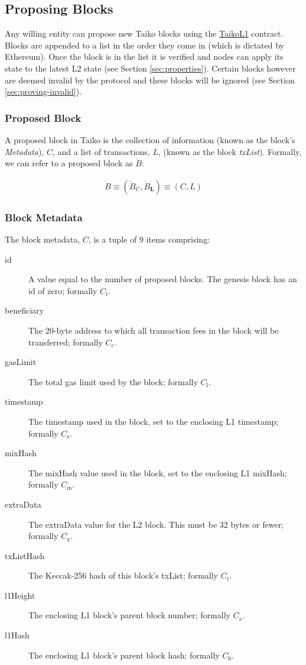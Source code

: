 \documentclass[9pt,oneside]{amsart}
\begin{document}
\begin{multicols}{2}
\subsection{Proposing Blocks}
Any willing entity can propose new Taiko blocks using the {\underline{TaikoL1}} contract. Blocks are appended to a list in the order they come in (which is dictated by Ethereum). Once the block is in the list it is verified and nodes can apply its state to the latest L2 state (see Section \ref{sec:properties}). Certain blocks however are deemed invalid by the protocol and these blocks will be ignored (see Section \ref{sec:proving-invalid}).

\subsubsection{Proposed Block} A proposed block in Taiko is the collection of information (known as the block's \emph{Metadata}), $C$, and a list of transactions, $L$,  (known as the block \emph{txList}). Formally, we can refer to a proposed block as $\dot{B}$:

\begin{eqnarray}
\dot{B} \equiv (\dot{B}_{\mathrm{C}}, \dot{B}_{\mathbf{L}}) \equiv (C, L)
\end{eqnarray}

\subsubsection{Block Metadata}\label{metadata} The block metadata, $C$, is a tuple of 9 items comprising:

\begin{description}
\item[id] A value equal to the number of proposed blocks. The genesis block has an id of zero; formally $C_{\mathrm{i}}$.
\item[beneficiary] The 20-byte address to which all transaction fees in the block will be transferred; formally $C_{\mathrm{c}}$.
\item[gasLimit] The total gas limit used by the block; formally $C_{\mathrm{l}}$.
\item[timestamp] The timestamp used in the block, set to the enclosing L1 timestamp; formally $C_{\mathrm{s}}$.
\item[mixHash] The mixHash value used in the block, set to the enclosing L1 mixHash; formally $C_{\mathrm{m}}$.
\item[extraData] The extraData value for the L2 block. This must be 32 bytes or fewer; formally $C_{\mathrm{x}}$.
\item[txListHash] The Keccak-256 hash of this block's txList; formally $C_{\mathrm{t}}$. 
\item[l1Height] The enclosing L1 block's parent block number; formally $C_{\mathrm{a}}$.
\item[l1Hash] The enclosing L1 block's parent block hash; formally $C_{\mathrm{h}}$.
\end{description}


\end{multicols}
\end{document}
